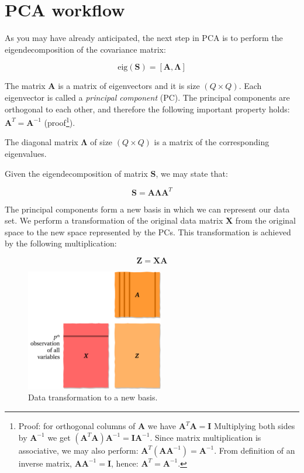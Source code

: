 \documentclass[10pt,twocolumn]{article}
\begin{document}
\section{PCA workflow}

As you may have already anticipated, the next step in PCA is to perform the eigendecomposition of the covariance matrix:

\begin{equation} \label{eq:eig-dec}
\text{eig}(\bm{S}) = [\bm{A}, \bm{\Lambda}]
\end{equation}

The matrix $\bm{A}$ is a matrix of eigenvectors and it is size $(Q \times Q)$. Each eigenvector is called a \textit{principal component} (PC). The principal components are orthogonal to each other, and therefore the following important property holds: $\bm{A}^T = \bm{A}^{-1}$ (proof\footnote{Proof: for orthogonal columns of $\bm{A}$ we have $\bm{A}^T \bm{A} = \bm{I}$ Multiplying both sides by $\bm{A}^{-1}$ we get $(\bm{A}^T \bm{A}) \bm{A}^{-1}= \bm{I}\bm{A}^{-1}$. Since matrix multiplication is associative, we may also perform: $\bm{A}^T (\bm{A} \bm{A}^{-1}) = \bm{A}^{-1}$. From definition of an inverse matrix,  $\bm{A} \bm{A}^{-1} = \bm{I}$, hence: $\bm{A}^T = \bm{A}^{-1}$.}).

The diagonal matrix $\bm{\Lambda}$ of size $(Q \times Q)$ is a matrix of the corresponding eigenvalues.

Given the eigendecomposition of matrix $\bm{S}$, we may state that: 

\begin{equation} \label{eq:eig-dec-cov-matrix}
\bm{S} = \bm{A} \bm{\Lambda} \bm{A}^T
\end{equation}

The principal components form a new basis in which we can represent our data set. We perform a transformation of the original data matrix $\bm{X}$ from the original space to the new space represented by the PCs. This transformation is achieved by the following multiplication:

\begin{equation} \label{eq:data-transform}
\bm{Z} = \bm{X} \bm{A}
\end{equation}

\begin{figure}[H]
\centering\includegraphics[width=6cm]{data-transformation.png}
\caption{Data transformation to a new basis.}
\label{fig:data-transformation}
\end{figure}
\end{document}
